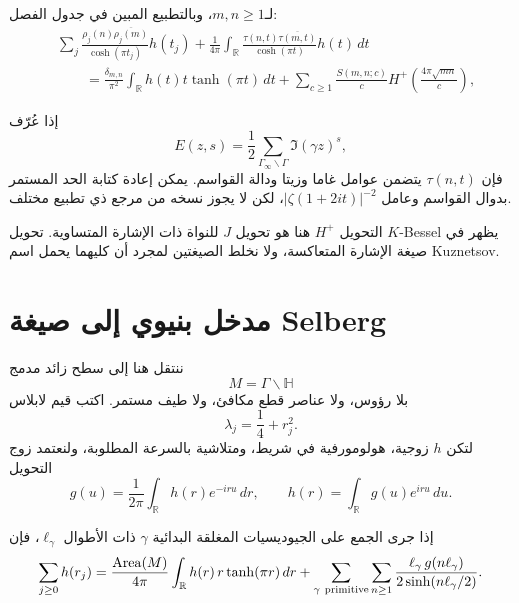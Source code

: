\begin{theorem}
\label{thm:kuznetsov-trace}
لـ\(m,n\ge1\)، وبالتطبيع المبين في جدول الفصل:
\[
\begin{aligned}
&\sum_j
\frac{\rho_j(n)\overline{\rho_j(m)}}{\cosh(\pi t_j)}h(t_j)
+\frac1{4\pi}\int_{\mathbb R}
\frac{\tau(n,t)\overline{\tau(m,t)}}{\cosh(\pi t)}
h(t)\,dt\\
&\qquad
=
\frac{\delta_{m,n}}{\pi^2}\int_{\mathbb R}
h(t)t\tanh(\pi t)\,dt
+\sum_{c\ge1}\frac{S(m,n;c)}{c}
H^+\!\left(\frac{4\pi\sqrt{mn}}{c}\right),
\end{aligned}
\]
\end{theorem}

\begin{remark}
إذا عُرّف
\[
E(z,s)=\frac12\sum_{\Gamma_\infty\backslash\Gamma}
\Im(\gamma z)^s,
\]
فإن \(\tau(n,t)\) يتضمن عوامل غاما وزيتا ودالة القواسم. يمكن إعادة
كتابة الحد المستمر بدوال القواسم وعامل
\(|\zeta(1+2it)|^{-2}\)، لكن لا يجوز نسخه من مرجع ذي تطبيع مختلف.
\end{remark}

\begin{remark}[تحويل \(K\)]
التحويل \(H^+\) هنا هو تحويل \(J\) للنواة ذات الإشارة المتساوية.
تحويل \(K\)-Bessel يظهر في صيغة الإشارة المتعاكسة، ولا نخلط الصيغتين
لمجرد أن كليهما يحمل اسم Kuznetsov.
\end{remark}

\section{مدخل بنيوي إلى صيغة Selberg}

ننتقل هنا إلى سطح زائد مدمج
\[
M=\Gamma\backslash\mathbb H
\]
بلا رؤوس، ولا عناصر قطع مكافئ، ولا طيف مستمر. اكتب قيم لابلاس
\[
\lambda_j=\frac14+r_j^2.
\]
لتكن \(h\) زوجية، هولومورفية في شريط، ومتلاشية بالسرعة المطلوبة، ولنعتمد
زوج التحويل
\[
g(u)=\frac1{2\pi}\int_{\mathbb R}h(r)e^{-iru}\,dr,
\qquad
h(r)=\int_{\mathbb R}g(u)e^{iru}\,du.
\]

\begin{theorem}
\label{thm:selberg-compact-trace}
إذا جرى الجمع على الجيوديسيات المغلقة البدائية \(\gamma\) ذات الأطوال
\(\ell_\gamma\)، فإن
\[
\sum_{j\ge0}h(r_j)
=
\frac{\operatorname{Area}(M)}{4\pi}
\int_{\mathbb R}h(r)\,r\tanh(\pi r)\,dr
+\sum_{\gamma\ {\rm primitive}}\sum_{n\ge1}
\frac{\ell_\gamma\,g(n\ell_\gamma)}
{2\sinh(n\ell_\gamma/2)}.
\]
\end{theorem}

